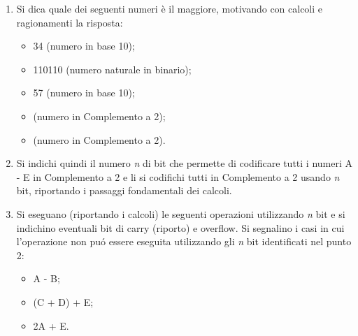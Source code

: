 \begin{Exercise}[label={ex:cp2}]
	\begin{enumerate}
		\item Si dica quale dei seguenti numeri \`e il maggiore, motivando con calcoli e ragionamenti la risposta:
			\begin{itemize}
				\item[A.] 34 (numero in base 10);
				\item[B.] 110110 (numero naturale in binario);
				\item[C.] 57 (numero in base 10);
				\item[D.] (numero in Complemento a 2);
				\item[E.] (numero in Complemento a 2).
			\end{itemize}
		\item Si indichi quindi il numero \emph{n} di bit che permette di codificare tutti i numeri A - E in Complemento a 2 e li si codifichi tutti in Complemento a 2 usando \emph{n} bit, riportando i passaggi fondamentali dei calcoli.
		\item Si eseguano (riportando i calcoli) le seguenti operazioni utilizzando \emph{n} bit e si indichino eventuali bit di carry (riporto) e overflow. Si segnalino i casi in cui l'operazione non pu\'o essere eseguita utilizzando gli \emph{n} bit identificati nel punto 2:
			\begin{itemize}
				\item[I.] A - B;
				\item[II.] (C + D) + E;
				\item[III.] 2A + E.
			\end{itemize}
	\end{enumerate}

\end{Exercise}

